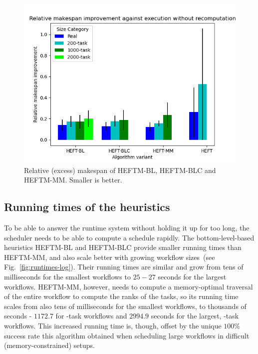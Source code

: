 \documentclass[conference]{IEEEtran}
\newcommand{\algo}[1]{\textsc{#1}}
\newcommand{\heftmm}{\algo{HEFTM-MM}\xspace}
\newcommand{\heftbl}{\algo{HEFTM-BL}\xspace}
\newcommand{\heftblc}{\algo{HEFTM-BLC}\xspace}
\begin{document}
    \begin{figure}[tb]
        \centering
        \includegraphics[width=0.8\columnwidth] {images/UpdatesMss2}
        \caption{Relative (excess) makespan of \heftbl, \heftblc and \heftmm. Smaller is better.}
        \label{fig:updates-ms}
        \vspace{-0.3cm}
    \end{figure}


\subsection{Running times of the heuristics}
\label{sec.expe.t}

    To be able to answer the runtime system without holding it up for too long, the scheduler needs to 
    be able to compute a schedule rapidly. %
    The bottom-level-based heuristics \heftbl and \heftblc provide smaller running times than \heftmm, 
    and also scale better with growing workflow
    sizes~(see Fig.~\ref{fig:runtimes-log}).
    Their running times are similar and grow from tens of milliseconds for the smallest workflows to $25-27$ seconds 
    for the largest workflows.
    \heftmm, however, needs to compute a memory-optimal traversal of the entire workflow to compute the ranks 
    of the tasks,
    so its running time scales from also tens of milliseconds for the smallest workflows, 
    to thousands of seconds - $1172.7$ for -task workflows and
    $2994.9$ seconds for the largest, -task workflows.
    This increased running time is, though, offset by the unique $100\%$ success rate this algorithm 
    obtained when scheduling large
    workflows in difficult (memory-constrained) setups.
    
\end{document}
